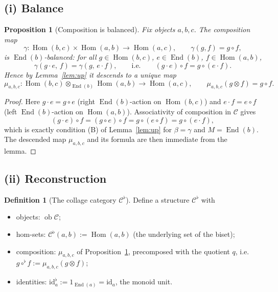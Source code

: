 \documentclass[11pt]{article}
\newtheorem{proposition}[theorem]{Proposition}
\theoremstyle{definition}
\newtheorem{definition}[theorem]{Definition}
\newcommand{\Hom}{\operatorname{Hom}}
\newcommand{\End}{\operatorname{End}}
\newcommand{\id}{\mathrm{id}}
\newcommand{\C}{\mathcal{C}}
\newcommand{\ob}{\operatorname{ob}}
\begin{document}
\subsection*{(i) Balance}

\begin{proposition}[Composition is balanced]\label{prop:balance}
Fix objects $a,b,c$. The composition map
\[
  \gamma : \Hom(b,c)\times\Hom(a,b)\to\Hom(a,c),
  \qquad \gamma(g,f) = g\circ f,
\]
is $\End(b)$-balanced: for all $g\in\Hom(b,c)$, $e\in\End(b)$,
$f\in\Hom(a,b)$,
\[
  \gamma(g\cdot e,\, f) = \gamma(g,\, e\cdot f),
  \qquad\text{i.e.}\qquad (g\cdot e)\circ f = g\circ(e\cdot f).
\]
Hence by Lemma~\ref{lem:up} it descends to a unique map
\[
  \mu_{a,b,c} : \Hom(b,c)\otimes_{\End(b)}\Hom(a,b)\longrightarrow\Hom(a,c),
  \qquad \mu_{a,b,c}(g\otimes f) = g\circ f .
\]
\end{proposition}

\begin{proof}
Here $g\cdot e = g\circ e$ (right $\End(b)$-action on $\Hom(b,c)$) and
$e\cdot f = e\circ f$ (left $\End(b)$-action on $\Hom(a,b)$). Associativity of
composition in $\C$ gives
\[
  (g\cdot e)\circ f = (g\circ e)\circ f = g\circ(e\circ f) = g\circ(e\cdot f),
\]
which is exactly condition (B) of Lemma~\ref{lem:up} for $\beta=\gamma$ and
$M=\End(b)$. The descended map $\mu_{a,b,c}$ and its formula are then immediate
from the lemma.
\end{proof}

\subsection*{(ii) Reconstruction}

\begin{definition}[The collage category $\C^{\flat}$]\label{def:collage}
Define a structure $\C^{\flat}$ with
\begin{itemize}
\item objects: $\ob\C$;
\item hom-sets: $\C^{\flat}(a,b) := \Hom(a,b)$ (the underlying set of the
biset);
\item composition: $\mu_{a,b,c}$ of Proposition~\ref{prop:balance}, precomposed
with the quotient $q$, i.e. $g\circ^{\flat} f := \mu_{a,b,c}(g\otimes f)$;
\item identities: $\id^{\flat}_a := 1_{\End(a)} = \id_a$, the monoid unit.
\end{itemize}
\end{definition}
\end{document}
